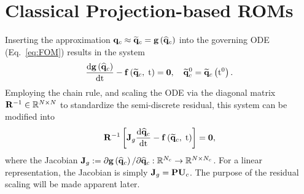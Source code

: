 \section{Classical Projection-based ROMs}\label{sec:classicROMs}

Inserting the approximation $\mathbf{q}_{c} \approx \mathbf{\widetilde{q}}_{c} = \mathbf{g} \left(\mathbf{\widehat{q}}_{c}\right)$ into the governing ODE (Eq.~\ref{eq:FOM}) results in the system
%
\begin{equation}\label{eq:romFullODE}
    \frac{\text{d} \mathbf{g} \left(\mathbf{\widehat{q}}_{c}\right)}{\text{d} \text{t}} - \mathbf{f} \left(\mathbf{\widetilde{q}}_{c}, \; \text{t}\right) = \mathbf{0}, \quad \mathbf{\widetilde{q}}_{c}^0 = \mathbf{\widetilde{q}}_{c} \left(\text{t}^0\right).
\end{equation}
%
Employing the chain rule, and scaling the ODE via the diagonal matrix $\resScaleInv \inRTwo{\numDOF}{\numDOF}$ to standardize the semi-discrete residual, this system can be modified into
%
\begin{equation}\label{eq:romFullODEMod}
    \resScaleInv \left[ \jacobDecode \ode{\consVecCoef}{\timeVar} - \rhsFunc{\consVecRom, \; \timeVar} \right] = \zeroVec,
\end{equation}
%
where the Jacobian $\mathbf{J}_{g} := \partial \mathbf{g} \left(\mathbf{\widehat{q}}_{c}\right) / \partial \mathbf{\widehat{q}}_{c}: \mathbb{R}^{N_c} \rightarrow \mathbb{R}^{N \times N_c}$. For a linear representation, the Jacobian is simply $\jacobDecode = \consScale \consTrial$. The purpose of the residual scaling will be made apparent later.

